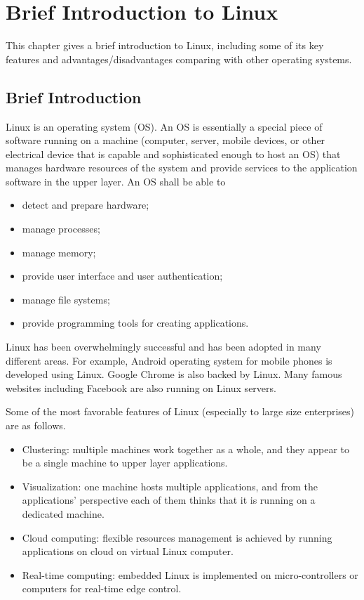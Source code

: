 \chapter{Brief Introduction to Linux}

This chapter gives a brief introduction to Linux, including some of its key features and advantages/disadvantages comparing with other operating systems.

\section{Brief Introduction}

Linux is an operating system (OS). An OS is essentially a special piece of software running on a machine (computer, server, mobile devices, or other electrical device that is capable and sophisticated enough to host an OS) that manages hardware resources of the system and provide services to the application software in the upper layer. An OS shall be able to
\begin{itemize}
  \item detect and prepare hardware;
  \item manage processes;
  \item manage memory;
  \item provide user interface and user authentication;
  \item manage file systems;
  \item provide programming tools for creating applications.
\end{itemize}

Linux has been overwhelmingly successful and has been adopted in many different areas. For example, Android operating system for mobile phones is developed using Linux. Google Chrome is also backed by Linux. Many famous websites including Facebook are also running on Linux servers.

Some of the most favorable features of Linux (especially to large size enterprises) are as follows.
\begin{itemize}
  \item Clustering: multiple machines work together as a whole, and they appear to be a single machine to upper layer applications.
  \item Visualization: one machine hosts multiple applications, and from the applications' perspective each of them thinks that it is running on a dedicated machine.
  \item Cloud computing: flexible resources management is achieved by running applications on cloud on virtual Linux computer.
  \item Real-time computing: embedded Linux is implemented on micro-controllers or computers for real-time edge control.
\end{itemize}

